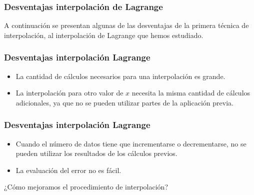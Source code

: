 \documentclass[12pt]{beamer}
\begin{document}
\begin{frame}
\frametitle{Desventajas interpolación de Lagrange}
A continuación se presentan algunas de las desventajas de la primera técnica de interpolación, al interpolación de Lagrange que hemos estudiado.
\end{frame}
\begin{frame}
\frametitle{Desventajas interpolación Lagrange}
\begin{itemize}[<+->]
\item[\ding{212}] La cantidad de cálculos necesarios para una interpolación es grande.
\item[\ding{212}] La interpolación para otro valor de $x$ necesita la misma cantidad de cálculos adicionales, ya que no se pueden utilizar partes de la aplicación previa.
\end{itemize}
\end{frame}
\begin{frame}
\frametitle{Desventajas interpolación Lagrange}
\begin{itemize}[<+->]
\item[\ding{212}] Cuando el número de datos tiene que incrementarse o decrementarse, no se pueden utilizar los resultados de los cálculos previos.
\item[\ding{212}] La evaluación del error no es fácil.
\end{itemize}
\pause
¿Cómo mejoramos el procedimiento de interpolación?
\end{frame}
\end{document}
